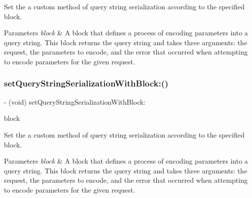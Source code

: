 Set the a custom method of query string serialization according to the specified block.


\begin{DoxyParams}{Parameters}
{\em block} & A block that defines a process of encoding parameters into a query string. This block returns the query string and takes three arguments\+: the request, the parameters to encode, and the error that occurred when attempting to encode parameters for the given request. \\
\hline
\end{DoxyParams}
\mbox{\label{interface_a_f_h_t_t_p_request_serializer_a3b30fd73d2913d6c86ac338f79a88c68}} 
\subsubsection{\texorpdfstring{set\+Query\+String\+Serialization\+With\+Block\+:()}{setQueryStringSerializationWithBlock:()}\hspace{0.1cm}{\footnotesize\ttfamily [3/3]}}
{\footnotesize\ttfamily -\/ (void) set\+Query\+String\+Serialization\+With\+Block\+: \begin{DoxyParamCaption}\item[{(nullable N\+S\+String $\ast$($^\wedge$)(N\+S\+U\+R\+L\+Request $\ast$request, id parameters, N\+S\+Error $\ast$\+\_\+\+\_\+autoreleasing $\ast$error))}]{block }\end{DoxyParamCaption}}

Set the a custom method of query string serialization according to the specified block.


\begin{DoxyParams}{Parameters}
{\em block} & A block that defines a process of encoding parameters into a query string. This block returns the query string and takes three arguments\+: the request, the parameters to encode, and the error that occurred when attempting to encode parameters for the given request. \\
\hline
\end{DoxyParams}
\mbox{\label{interface_a_f_h_t_t_p_request_serializer_af86bfabe2989e5730b187fe5f2f2a9e7}} 
